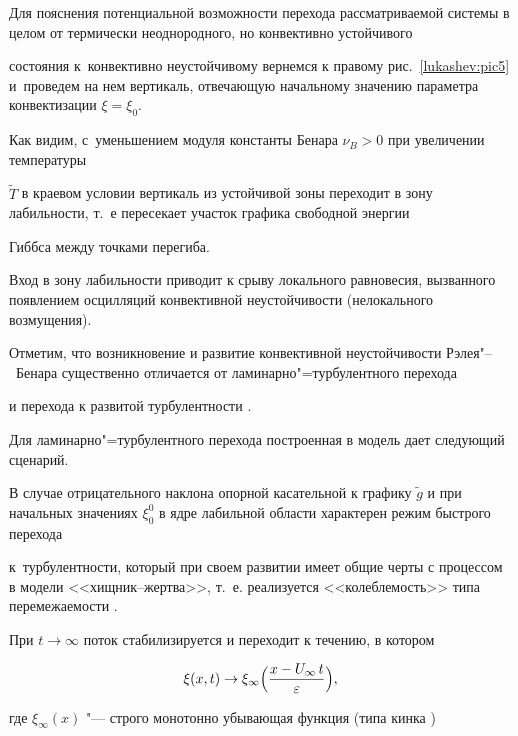 Для пояснения потенциальной возможности перехода рассматриваемой системы в целом от термически неоднородного, но конвективно устойчивого

состояния к~конвективно неустойчивому вернемся к правому рис.~\ref{lukashev:pic5} и~проведем на нем вертикаль, отвечающую начальному значению параметра конвектизации $\xi=\xi_0$. 

Как видим, с~уменьшением модуля константы Бенара $\nu_B>0$ при увеличении температуры

$\widetilde{T}$ в краевом условии вертикаль из устойчивой зоны переходит в зону лабильности, т.~е пересекает участок графика свободной энергии

Гиббса между точками перегиба.



Вход в зону лабильности приводит к срыву  локального равновесия, вызванного появлением осцилляций конвективной неустойчивости (нелокального возмущения).



Отметим, что возникновение и развитие конвективной неустойчивости Рэлея"--~Бенара существенно отличается от ламинарно"=турбулентного перехода

и перехода к развитой турбулентности \cite{lukashev:bib50}.



Для ламинарно"=турбулентного перехода построенная в \cite{lukashev:bib50} модель дает следующий сценарий. 

В случае отрицательного наклона опорной касательной к графику $\widetilde{g}$ и при начальных значениях $\xi_0^0$ в ядре лабильной области характерен режим быстрого перехода

к~турбулентности, который при своем развитии имеет общие черты с процессом в модели <<хищник--жертва>>, т.~е. реализуется <<колеблемость>> типа перемежаемости \cite{lukashev:bib53}. 

При  $t\to\infty$ поток стабилизируется и переходит к течению, в котором

$$\xi(x,t)\to \xi_\infty 

\Bigl(\frac{x-U_\infty\,t}{\varepsilon} \Bigr),$$ 


где $\xi_\infty(x)$  "--- строго монотонно убывающая функция (типа кинка \cite{kinka:type}) 


